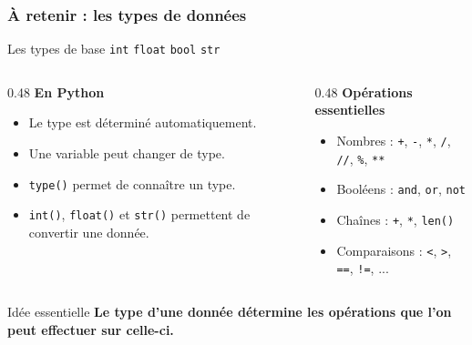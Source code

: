 \documentclass[10pt]{beamer}
\begin{document}
\begin{frame}
	\frametitle{À retenir : les types de données}
	
	\begin{block}{Les types de base}
		\centering
		\texttt{int} \quad
		\texttt{float} \quad
		\texttt{bool} \quad
		\texttt{str}
	\end{block}
	
	\vspace{0.2cm}
	
	\begin{columns}[T]
		\begin{column}{0.48\textwidth}
			\textbf{En Python}
			\begin{itemize}
				\item Le type est déterminé automatiquement.
				\item Une variable peut changer de type.
				\item \texttt{type()} permet de connaître un type.
				\item \texttt{int()}, \texttt{float()} et \texttt{str()}
				permettent de convertir une donnée.
			\end{itemize}
		\end{column}
		
		\begin{column}{0.48\textwidth}
			\textbf{Opérations essentielles}
			\begin{itemize}
				\item Nombres : \texttt{+}, \texttt{-}, \texttt{*}, \texttt{/}, \texttt{//}, \texttt{\%}, \texttt{**}
				\item Booléens : \texttt{and}, \texttt{or}, \texttt{not}
				\item Chaînes : \texttt{+}, \texttt{*}, \texttt{len()}
				\item Comparaisons : \texttt{<}, \texttt{>}, \texttt{==}, \texttt{!=}, ...
			\end{itemize}
		\end{column}
	\end{columns}
	
	\vspace{0.25cm}
	
	\begin{exampleblock}{Idée essentielle}
		\centering
		\textbf{Le type d'une donnée détermine les opérations que l'on peut effectuer sur celle-ci.}
	\end{exampleblock}
	
\end{frame}
\end{document}
